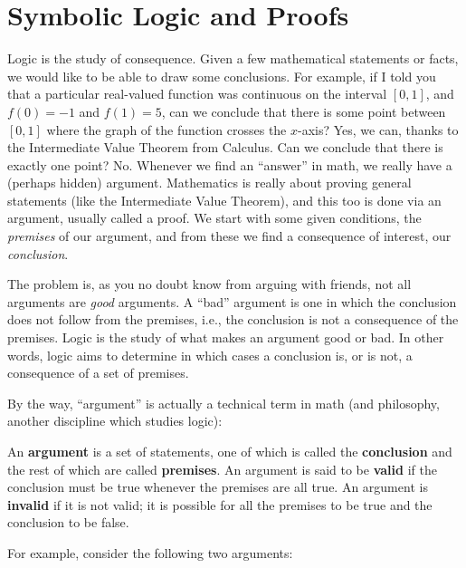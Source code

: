 \documentclass[10pt,]{book}
\newcommand{\terminology}[1]{\textbf{#1}}
\theoremstyle{plain}
\theoremstyle{definition}
\theoremstyle{definition}
\theoremstyle{definition}
\theoremstyle{definition}
\numberwithin{equation}{chapter}
\begin{document}
\chapter[{Symbolic Logic and Proofs}]{Symbolic Logic and Proofs}\label{ch_logic}
\hypertarget{p-981}{}%
Logic is the study of consequence. Given a few mathematical statements or facts, we would like to be able to draw some conclusions. For example, if I told you that a particular real-valued function was continuous on the interval \([0,1]\), and \(f(0) = -1\) and \(f(1) = 5\), can we conclude that there is some point between \([0,1]\) where the graph of the function crosses the \(x\)-axis? Yes, we can, thanks to the Intermediate Value Theorem from Calculus. Can we conclude that there is exactly one point? No. Whenever we find an ``answer'' in math, we really have a (perhaps hidden) argument. Mathematics is really about proving general statements (like the Intermediate Value Theorem), and this too is done via an argument, usually called a proof. We start with some given conditions, the \emph{premises} of our argument, and from these we find a consequence of interest, our \emph{conclusion}.%
\par
\hypertarget{p-982}{}%
The problem is, as you no doubt know from arguing with friends, not all arguments are \emph{good} arguments. A ``bad'' argument is one in which the conclusion does not follow from the premises, i.e., the conclusion is not a consequence of the premises. Logic is the study of what makes an argument good or bad. In other words, logic aims to determine in which cases a conclusion is, or is not, a consequence of a set of premises.%
\par
\hypertarget{p-983}{}%
By the way, ``argument'' is actually a technical term in math (and philosophy, another discipline which studies logic):%
\begin{assemblage}[Arguments]\label{assemblage-24}
\hypertarget{p-984}{}%
An \terminology{argument} is a set of statements, one of which is called the \terminology{conclusion} and the rest of which are called \terminology{premises}. An argument is said to be \terminology{valid} if the conclusion must be true whenever the premises are all true. An argument is \terminology{invalid} if it is not valid; it is possible for all the premises to be true and the conclusion to be false.%
\end{assemblage}
\hypertarget{p-985}{}%
For example, consider the following two arguments:%
\end{document}
